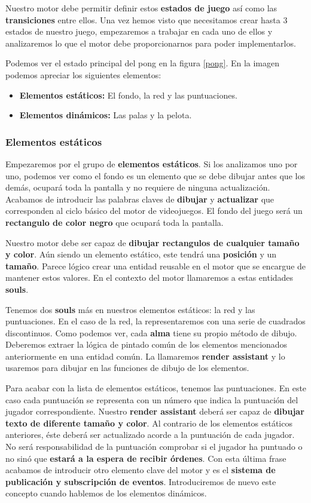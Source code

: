 \documentclass[a4paper]{article}
\begin{document}
Nuestro motor debe permitir definir estos \textbf{estados de juego} así como las \textbf{transiciones} entre ellos. Una vez hemos visto que necesitamos crear hasta 3 estados de nuestro juego, empezaremos a trabajar en cada uno de ellos y analizaremos lo que el motor debe proporcionarnos para poder implementarlos.


Podemos ver el estado principal del pong en la figura \ref{pong}. En la imagen podemos apreciar los siguientes elementos:

\begin{itemize}
  \item \textbf{Elementos estáticos:} El fondo, la red y las puntuaciones.
  \item \textbf{Elementos dinámicos:} Las palas y la pelota.
\end{itemize}

\subsubsection{Elementos estáticos}

Empezaremos por el grupo de \textbf{elementos estáticos}. Si los analizamos uno por uno, podemos ver como el fondo es un elemento que se debe dibujar antes que los demás, ocupará toda la pantalla y no requiere de ninguna actualización. Acabamos de introducir las palabras claves de \textbf{dibujar} y \textbf{actualizar} que corresponden al ciclo básico del motor de videojuegos.
El fondo del juego será un \textbf{rectangulo de color negro} que ocupará toda la pantalla. 

Nuestro motor debe ser capaz de \textbf{dibujar rectangulos de cualquier tamaño y color}. Aún siendo un elemento estático, este tendrá una \textbf{posición} y un \textbf{tamaño}. Parece lógico crear una entidad reusable en el motor que se encargue de mantener estos valores. En el contexto del motor llamaremos a estas entidades \textbf{souls}.

Tenemos dos \textbf{souls} más en nuestros elementos estáticos: la red y las puntuaciones. En el caso de la red, la representaremos con una serie de cuadrados discontinuos. Como podemos ver, cada \textbf{alma} tiene su propio método de dibujo. Deberemos extraer la lógica de pintado común de los elementos mencionados anteriormente en una entidad común. La llamaremos \textbf{render assistant} y lo usaremos para dibujar en las funciones de dibujo de los elementos.

Para acabar con la lista de elementos estáticos, tenemos las puntuaciones. En este caso cada puntuación se representa con un número que indica la puntuación del jugador correspondiente. Nuestro \textbf{render assistant} deberá ser capaz de \textbf{dibujar texto de diferente tamaño y color}. Al contrario de los elementos estáticos anteriores, éste deberá ser actualizado acorde a la puntuación de cada jugador. No será responsabilidad de la puntuación comprobar si el jugador ha puntuado o no sinó que \textbf{estará a la espera de recibir órdenes}. Con esta última frase acabamos de introducir otro elemento clave del motor y es el \textbf{sistema de publicación y subscripción de eventos}. Introduciremos de nuevo este concepto cuando hablemos de los elementos dinámicos.
\end{document}
